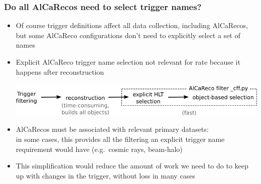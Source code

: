 \documentclass[compress]{beamer}
\begin{document}
\begin{frame}
\frametitle{Do all AlCaRecos need to select trigger names?}

\vfill
\begin{itemize}\setlength{\itemsep}{0.5 cm}

\item Of course trigger definitions affect all data collection,
  including AlCaRecos, but some AlCaReco configurations don't need to
  explicitly select a set of names

\item Explicit AlCaReco trigger name selection not relevant for rate
  because it happens after reconstruction

\vspace{0.1 cm}
\includegraphics[width=\linewidth]{alca_path2.png}

\item AlCaRecos must be associated with relevant primary datasets: \\ in
  some cases, this provides all the filtering an explicit trigger name
  requirement would have (e.g.\ cosmic rays, beam-halo)

\item This simplification would reduce the amount of work we need to
  do to keep up with changes in the trigger, without loss in many cases

\end{itemize}

\end{frame}
\end{document}
